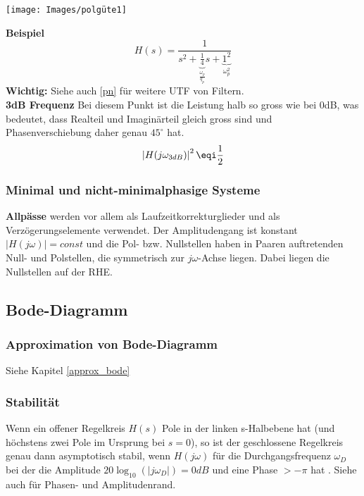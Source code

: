 \begin{center}
	\texttt{[image: Images/polgüte1]}
\end{center}

\noindent\textbf{Beispiel}
\[
H(s) = \frac{1}{s^2 + \underbrace{\frac{1}{4}}_{\frac{\omega_p}{q_p}}s + \underbrace{1^2}_{\omega_p^2}}
\]
\textbf{Wichtig:} Siehe auch \ref{pn} für weitere UTF von Filtern.\\

\noindent\textbf{3dB Frequenz}
Bei diesem Punkt ist die Leistung halb so gross wie bei 0dB, was bedeutet, dass Realteil und Imaginärteil gleich gross sind und Phasenverschiebung daher genau $45^\circ$ hat.
\[
\left|H(j\omega_{3dB})\right|^2 \eqi \frac{1}{2}
\]

\subsubsection{Minimal und nicht-minimalphasige Systeme}
\textbf{Allpässe} werden vor allem als Laufzeitkorrekturglieder und als Verzögerungselemente verwendet. Der Amplitudengang ist konstant $\left|H(j\omega)\right| = const$ und die Pol- bzw. Nullstellen haben in Paaren auftretenden Null- und Polstellen, die symmetrisch zur $j\omega$-Achse liegen. Dabei liegen die Nullstellen auf der RHE.

\subsection{Bode-Diagramm}
\subsubsection{Approximation von Bode-Diagramm}
Siehe Kapitel \ref{approx_bode}

\subsubsection{Stabilität}
Wenn ein offener Regelkreis $H(s)$ Pole in der linken s-Halbebene hat (und höchstens zwei Pole im Ursprung bei $s=0$), so ist der geschlossene Regelkreis genau dann asymptotisch stabil, wenn $H(j\omega)$ für die Durchgangsfrequenz $\omega_D$ bei der die Amplitude $20\log_{10}(\left|j\omega_D\right|) = 0dB$ und eine Phase $> -\pi$ hat . Siehe auch  für Phasen- und Amplitudenrand.

